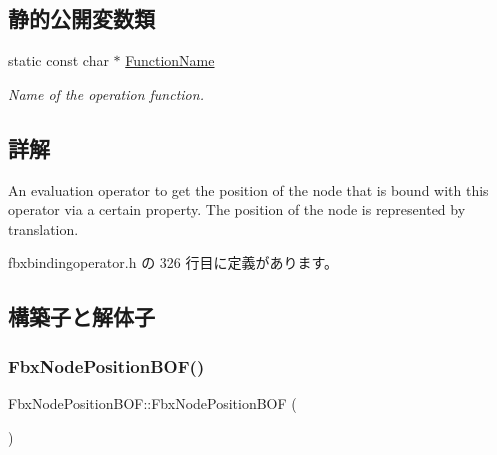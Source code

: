 \subsection*{静的公開変数類}
\begin{DoxyCompactItemize}
\item 
static const char $\ast$ \hyperlink{class_fbx_node_position_b_o_f_aaa0c4610384d1dbb4e566bad44c356ee}{Function\+Name}
\begin{DoxyCompactList}\small\item\em Name of the operation function. \end{DoxyCompactList}\end{DoxyCompactItemize}


\subsection{詳解}
An evaluation operator to get the position of the node that is bound with this operator via a certain property. The position of the node is represented by translation. 

 fbxbindingoperator.\+h の 326 行目に定義があります。



\subsection{構築子と解体子}
\mbox{\label{class_fbx_node_position_b_o_f_a3aa291cede0af3b651fe2dbc57914ff6}} 
\subsubsection{\texorpdfstring{Fbx\+Node\+Position\+B\+O\+F()}{FbxNodePositionBOF()}}
{\footnotesize\ttfamily Fbx\+Node\+Position\+B\+O\+F\+::\+Fbx\+Node\+Position\+B\+OF (\begin{DoxyParamCaption}{ }\end{DoxyParamCaption})}

\mbox{\label{class_fbx_node_position_b_o_f_af99d0ed70d8a877472932fa6ccb39199}} 
